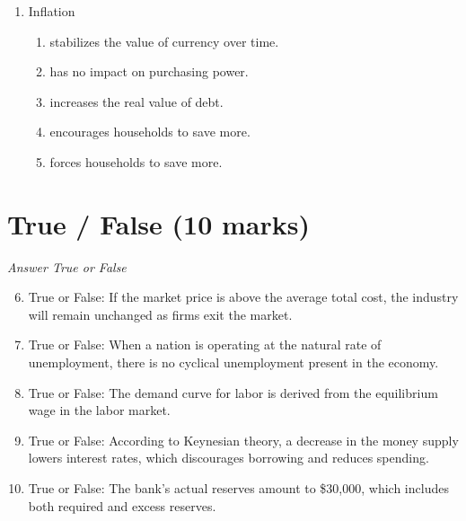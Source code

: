 \documentclass[12pt]{article}
\begin{document}
\begin{enumerate}[label=\arabic*.]
\begin{enumerate}[label=(\alph*)]
    \item Capitalism results in single authority
    \item Capitalism ensures job security
    \item Capitalism fosters cultural diversity
    \item Capitalism promotes personal freedom
    \item Capitalism encourages moral responsibility
\end{enumerate}
\item Inflation
\begin{enumerate}[label=(\alph*)]
    \item stabilizes the value of currency over time.
    \item has no impact on purchasing power.
    \item increases the real value of debt.
    \item encourages households to save more.
    \item forces households to save more.
\end{enumerate}
\end{enumerate}

\section*{True / False (10 marks)}
\textit{Answer True or False}
\begin{enumerate}[label=\arabic*.]
\setcounter{enumi}{5}
\item True or False: If the market price is above the average total cost, the industry will remain unchanged as firms exit the market.
\item True or False: When a nation is operating at the natural rate of unemployment, there is no cyclical unemployment present in the economy.
\item True or False: The demand curve for labor is derived from the equilibrium wage in the labor market.
\item True or False: According to Keynesian theory, a decrease in the money supply lowers interest rates, which discourages borrowing and reduces spending.
\item True or False: The bank's actual reserves amount to \$30,000, which includes both required and excess reserves.
\end{enumerate}
\end{document}
